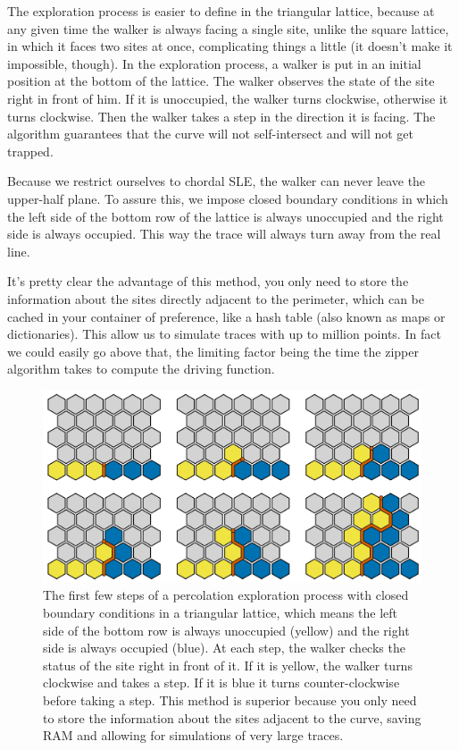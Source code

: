 The exploration process is easier to define in the triangular lattice, because
at any given time the walker is always facing a single site, unlike the square
lattice, in which it faces two sites at once, complicating things a little (it
doesn't make it impossible, though). In the exploration process, a walker is
put in an initial position at the bottom of the lattice. The walker observes
the state of the site right in front of him. If it is unoccupied, the walker
turns clockwise, otherwise it turns clockwise. Then the walker takes a step in
the direction it is facing. The algorithm guarantees that the curve will not
self-intersect and will not get trapped.

Because we restrict ourselves to chordal SLE, the walker can never leave the
upper-half plane. To assure this, we impose closed boundary conditions in which
the left side of the bottom row of the lattice is always unoccupied and the
right side is always occupied. This way the trace will always turn away from
the real line.

It's pretty clear the advantage of this method, you only need to store the
information about the sites directly adjacent to the perimeter, which can be
cached in your container of preference, like a hash table (also known as maps
or dictionaries). This allow us to simulate traces with up to million points.
In fact we could easily go above that, the limiting factor being the time the
zipper algorithm takes to compute the driving function.

\begin{figure}
\begin{center}
    \includegraphics[scale=0.45]{chapters/ch6-asle/figs/explore}
\end{center}
\caption{The first few steps of a percolation exploration process with closed
    boundary conditions in a triangular lattice, which means the left side of
    the bottom row is always unoccupied (yellow) and the right side is always
    occupied (blue). At each step, the walker checks the status of the site
    right in front of it. If it is yellow, the walker turns clockwise and takes
    a step. If it is blue it turns counter-clockwise before taking a step. This
    method is superior because you only need to store the information about the
    sites adjacent to the curve, saving RAM and allowing for simulations of
    very large traces.}
\label{fig:explore}
\end{figure}


